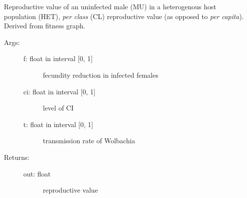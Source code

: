\documentclass[letterpaper,10pt,english]{sphinxmanual}
\begin{document}
\begin{fulllineitems}
\label{index:wspec.analytical.reproval_MUHETCL}
Reproductive value of an uninfected male (MU) in a heterogenous 
host population (HET), \emph{per class} (CL) reproductive value (as 
opposed to \emph{per capita}). Derived from fitness graph.
\begin{description}
\item[{Args:}] \leavevmode\begin{description}
\item[{f: float in interval {[}0, 1{]}}] \leavevmode
fecundity reduction in infected females

\item[{ci: float in interval {[}0, 1{]}}] \leavevmode
level of CI

\item[{t: float in interval {[}0, 1{]}}] \leavevmode
transmission rate of Wolbachia

\end{description}

\item[{Returns:}] \leavevmode\begin{description}
\item[{out: float}] \leavevmode
reproductive value

\end{description}

\end{description}

\end{fulllineitems}

\end{document}
